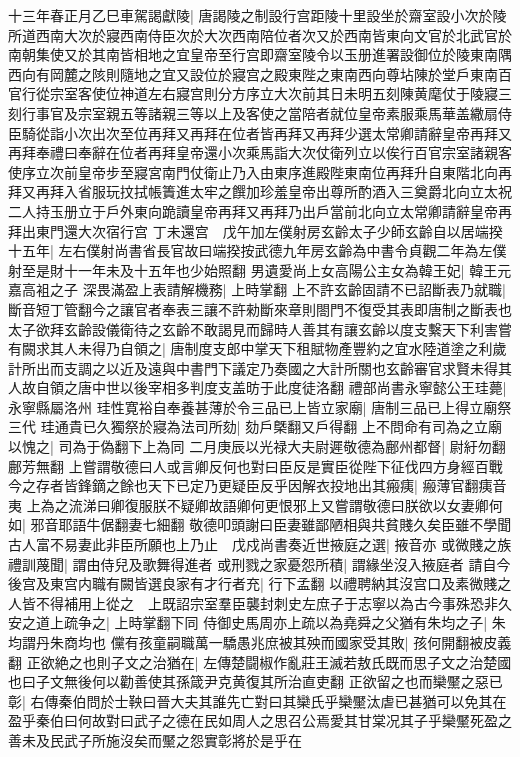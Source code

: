 十三年春正月乙巳車駕謁獻陵|{
	唐謁陵之制設行宫距陵十里設坐於齋室設小次於陵所道西南大次於寢西南侍臣次於大次西南陪位者次又於西南皆東向文官於北武官於南朝集使又於其南皆相地之宜皇帝至行宫即齋室陵令以玉册進署設御位於陵東南隅西向有岡麓之陔則隨地之宜又設位於寢宫之殿東陛之東南西向尊坫陳於堂戶東南百官行從宗室客使位神道左右寢宫則分方序立大次前其日未明五刻陳黄麾仗于陵寢三刻行事官及宗室親五等諸親三等以上及客使之當陪者就位皇帝素服乘馬華盖繖扇侍臣騎從詣小次出次至位再拜又再拜在位者皆再拜又再拜少選太常卿請辭皇帝再拜又再拜奉禮曰奉辭在位者再拜皇帝還小次乘馬詣大次仗衛列立以俟行百官宗室諸親客使序立次前皇帝步至寢宮南門仗衛止乃入由東序進殿陛東南位再拜升自東階北向再拜又再拜入省服玩抆拭帳簀進太牢之饌加珍羞皇帝出尊所酌酒入三奠爵北向立太祝二人持玉册立于戶外東向跪讀皇帝再拜又再拜乃出戶當前北向立太常卿請辭皇帝再拜出東門還大次宿行宫}
丁未還宫　戊午加左僕射房玄齡太子少師玄齡自以居端揆十五年|{
	左右僕射尚書省長官故曰端揆按武德九年房玄齡為中書令貞觀二年為左僕射至是財十一年未及十五年也少始照翻}
男遺愛尚上女高陽公主女為韓王妃|{
	韓王元嘉高袓之子}
深畏滿盈上表請解機務|{
	上時掌翻}
上不許玄齡固請不已詔斷表乃就職|{
	斷音短丁管翻今之讓官者奉表三讓不許勑斷來章則閤門不復受其表即唐制之斷表也}
太子欲拜玄齡設儀衛待之玄齡不敢謁見而歸時人善其有讓玄齡以度支繫天下利害嘗有闕求其人未得乃自領之|{
	唐制度支郎中掌天下租賦物產豐約之宜水陸道塗之利歲計所出而支調之以近及遠與中書門下議定乃奏國之大計所關也玄齡審官求賢未得其人故自領之唐中世以後宰相多判度支盖昉于此度徒洛翻}
禮部尚書永寧懿公王珪薨|{
	永寧縣屬洛州}
珪性寛裕自奉養甚薄於令三品已上皆立家廟|{
	唐制三品已上得立廟祭三代}
珪通貴已久獨祭於寢為法司所劾|{
	劾戶槩翻又戶得翻}
上不問命有司為之立廟以愧之|{
	司為于偽翻下上為同}
二月庚辰以光禄大夫尉遲敬德為鄜州都督|{
	尉紆勿翻鄜芳無翻}
上嘗謂敬德曰人或言卿反何也對曰臣反是實臣從陛下征伐四方身經百戰今之存者皆鋒鏑之餘也天下已定乃更疑臣反乎因解衣投地出其瘢痍|{
	瘢薄官翻痍音夷}
上為之流涕曰卿復服朕不疑卿故語卿何更恨邪上又嘗謂敬德曰朕欲以女妻卿何如|{
	邪音耶語牛倨翻妻七細翻}
敬德叩頭謝曰臣妻雖鄙陋相與共貧賤久矣臣雖不學聞古人富不易妻此非臣所願也上乃止　戊戍尚書奏近世掖庭之選|{
	掖音亦}
或微賤之族禮訓蔑聞|{
	謂由侍兒及歌舞得進者}
或刑戮之家憂怨所積|{
	謂緣坐沒入掖庭者}
請自今後宫及東宫内職有闕皆選良家有才行者充|{
	行下孟翻}
以禮聘納其沒宫口及素微賤之人皆不得補用上從之　上既詔宗室羣臣襲封刺史左庶子于志寧以為古今事殊恐非久安之道上疏争之|{
	上時掌翻下同}
侍御史馬周亦上疏以為堯舜之父猶有朱均之子|{
	朱均謂丹朱商均也}
儻有孩童嗣職萬一驕愚兆庶被其殃而國家受其敗|{
	孩何開翻被皮義翻}
正欲絶之也則子文之治猶在|{
	左傳楚闘椒作亂莊王滅若敖氏既而思子文之治楚國也曰子文無後何以勸善使其孫箴尹克黄復其所治直吏翻}
正欲留之也而欒黶之惡已彰|{
	右傳秦伯問於士鞅曰晉大夫其誰先亡對曰其欒氏乎欒黶汰虐已甚猶可以免其在盈乎秦伯曰何故對曰武子之德在民如周人之思召公焉愛其甘棠况其子乎欒黶死盈之善未及民武子所施沒矣而黶之怨實彰將於是乎在}
